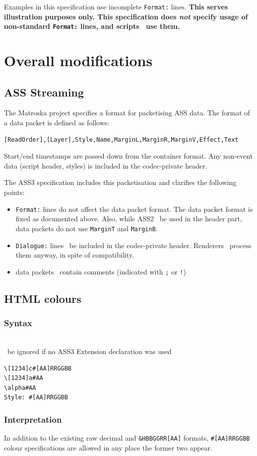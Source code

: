 \documentclass{spec}
\newcommand{\syntax}[1]{
	\subsubsection*{Syntax}
	\begin{tabbing}
	\hspace{2cm}\=\\[-16pt]
	#1
	\end{tabbing}
}
\gdef\compat{}
\newcommand{\mustuse}[1]{\must\ be ignored if no ASS3 Extension declaration was used%
\gappto{\compat}{\hspace{9pt} #1 & \textbf{required}\\[3pt]}}
\begin{document}
Examples in this specification use incomplete \texttt{Format:} lines.
\textbf{This serves illustration purposes only. This specification does \emph{not}
specify usage of non-standard \texttt{Format:} lines, and scripts \mustnot\ use them.}

\section{Overall modifications}
\subsection{ASS Streaming}
The Matroska project\cite{mkv} specifies a format for packetising ASS data.
The format of a data packet is defined as follows:

\begin{verbatim}
[ReadOrder],[Layer],Style,Name,MarginL,MarginR,MarginV,Effect,Text
\end{verbatim}

Start/end timestamps are passed down from the container format. Any non-event
data (script header, styles) is included in the codec-private header.

The ASS3 specification includes this packetisation and clarifies the following
points:
\begin{itemize}
\item \texttt{Format:} lines do not affect the data packet format.
The data packet format is fixed as documented above. Also, while ASS2 \may\ 
be used in the header part, data packets do not use \texttt{MarginT} and
\texttt{MarginB}.
\item \texttt{Dialogue:} lines \mustnot\ be included in the codec-private
header. Renderers \should\ process them anyway, in spite of compatibility.
\item data packets \mustnot\ contain comments (indicated with \verb!;! or
\verb;!;)
\end{itemize}

\subsection{HTML colours}
\syntax{\mustuse{HTML colours}}

\begin{verbatim}
\[1234]c#[AA]RRGGBB
\[1234]a#AA
\alpha#AA
Style: #[AA]RRGGBB
\end{verbatim}

\subsubsection*{Interpretation}
In addition to the existing raw decimal and \verb!&HBBGGRR[AA]! formats,
\verb!#[AA]RRGGBB! colour specifications are allowed in any
place the former two appear.
\end{document}
